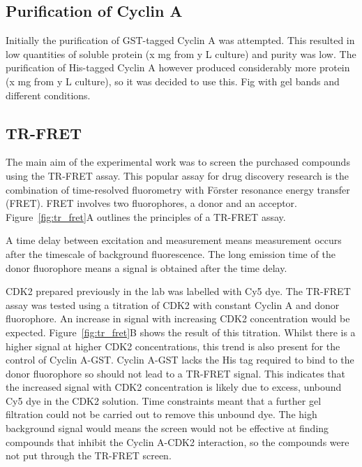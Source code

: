 \subsection{Purification of Cyclin A}

Initially the purification of GST-tagged Cyclin A was attempted.
This resulted in low quantities of soluble protein (x mg from y L culture) and purity was low.
The purification of His-tagged Cyclin A however produced considerably more protein (x mg from y L culture), so it was decided to use this.
Fig with gel bands and different conditions.


\subsection{TR-FRET}

The main aim of the experimental work was to screen the purchased compounds using the TR-FRET assay.
This popular assay for drug discovery research is the combination of time-resolved fluorometry with F\"{o}rster resonance energy transfer (FRET).
FRET involves two fluorophores, a donor and an acceptor.
Figure~\ref{fig:tr_fret}A outlines the principles of a TR-FRET assay.


A time delay between excitation and measurement means measurement occurs after the timescale of background fluorescence.
The long emission time of the donor fluorophore means a signal is obtained after the time delay.

CDK2 prepared previously in the lab was labelled with Cy5 dye.
The TR-FRET assay was tested using a titration of CDK2 with constant Cyclin A and donor fluorophore.
An increase in signal with increasing CDK2 concentration would be expected.
Figure~\ref{fig:tr_fret}B shows the result of this titration.
Whilst there is a higher signal at higher CDK2 concentrations, this trend is also present for the control of Cyclin A-GST.
Cyclin A-GST lacks the His tag required to bind to the donor fluorophore so should not lead to a TR-FRET signal.
This indicates that the increased signal with CDK2 concentration is likely due to excess, unbound Cy5 dye in the CDK2 solution.
Time constraints meant that a further gel filtration could not be carried out to remove this unbound dye.
The high background signal would means the screen would not be effective at finding compounds that inhibit the Cyclin A-CDK2 interaction, so the compounds were not put through the TR-FRET screen.

